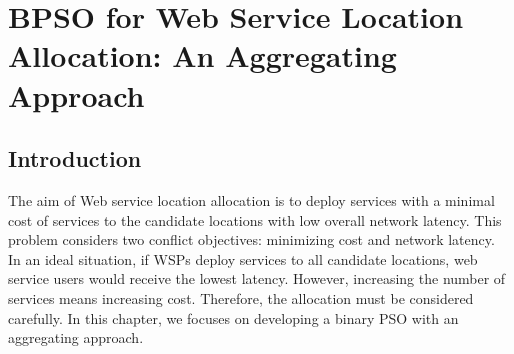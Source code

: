 % 
% 
% 
% 




\chapter{BPSO for Web Service Location Allocation: An Aggregating Approach}
\label{C:single}

\section{Introduction}
\label{sec:modelintro}

The aim of Web service location allocation is to deploy services with a minimal cost of services to the candidate locations with low overall network latency. 
This problem considers two conflict objectives: minimizing cost and network latency. In an ideal situation, if WSPs deploy services to all candidate
locations, web service users would receive the lowest latency. However, increasing the number of services means increasing cost. Therefore, the allocation must be considered
carefully. In this chapter, we focuses on developing a binary PSO with an aggregating approach.

